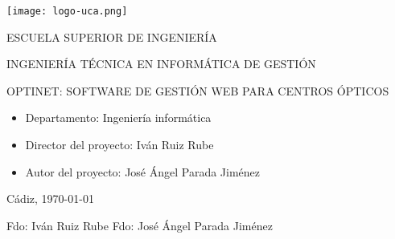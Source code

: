 


\begin{center}

  \texttt{[image: logo-uca.png]} \\

  \vspace{2.5cm}

  \Large{ESCUELA SUPERIOR DE INGENIERÍA} \\

  \vspace{1.0cm}

  \large{INGENIERÍA TÉCNICA EN INFORMÁTICA DE GESTIÓN} \\

  \vspace{2.0cm}

  \large{OPTINET: SOFTWARE DE GESTIÓN WEB PARA CENTROS ÓPTICOS} \\

  \vspace{2.5cm}

\end{center}

\begin{itemize}
\item \large{Departamento: Ingeniería informática}
\item \large{Director del proyecto: Iván Ruiz Rube}
\item \large{Autor del proyecto: José Ángel Parada Jiménez}
\end{itemize}

\vspace{0.2cm}

\begin{flushright}
  \large{Cádiz, \today} \\

  \vspace{3cm}

\large{Fdo: Iván Ruiz Rube}\hspace{6cm}
  \large{Fdo: José Ángel Parada Jiménez}
\end{flushright}
